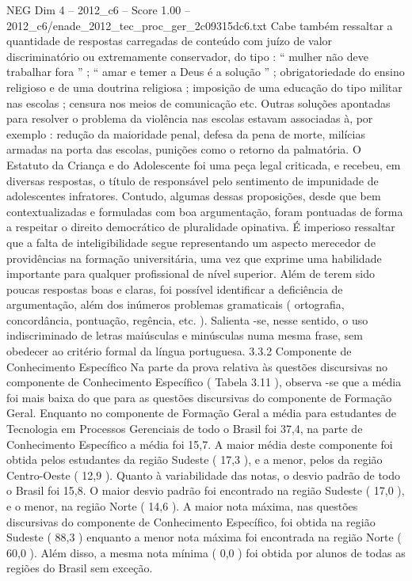 \begin{textsample}{NEG Dim 4 – 2012\_c6 – Score 1.00 – 2012\_c6/enade\_2012\_tec\_proc\_ger\_2c09315dc6.txt}
Cabe também ressaltar a quantidade de respostas carregadas de conteúdo com juízo de valor discriminatório ou extremamente conservador, do tipo : “ mulher não deve trabalhar fora ” ; “ amar e temer a Deus é a solução ” ; obrigatoriedade do ensino religioso e de uma doutrina religiosa ; imposição de uma educação do tipo militar nas escolas ; censura nos meios de comunicação etc.
Outras soluções apontadas para resolver o problema da violência nas escolas estavam associadas à, por exemplo : redução da maioridade penal, defesa da pena de morte, milícias armadas na porta das escolas, punições como o retorno da palmatória.
O Estatuto da Criança e do Adolescente foi uma peça legal criticada, e recebeu, em diversas respostas, o título de responsável pelo sentimento de impunidade de adolescentes infratores.
Contudo, algumas dessas proposições, desde que bem contextualizadas e formuladas com boa argumentação, foram pontuadas de forma a respeitar o direito democrático de pluralidade opinativa.
É imperioso ressaltar que a falta de inteligibilidade segue representando um aspecto merecedor de providências na formação universitária, uma vez que exprime uma habilidade importante para qualquer profissional de nível superior.
Além de terem sido poucas respostas boas e claras, foi possível identificar a deficiência de argumentação, além dos inúmeros problemas gramaticais ( ortografia, concordância, pontuação, regência, etc. ).
Salienta -se, nesse sentido, o uso indiscriminado de letras maiúsculas e minúsculas numa mesma frase, sem obedecer ao critério formal da língua portuguesa. 3.3.2 Componente de Conhecimento Específico Na parte da prova relativa às questões discursivas no componente de Conhecimento Específico ( Tabela 3.11 ), observa -se que a média foi mais baixa do que para as questões discursivas do componente de Formação Geral.
Enquanto no componente de Formação Geral a média para estudantes de Tecnologia em Processos Gerenciais de todo o Brasil foi 37,4, na parte de Conhecimento Específico a média foi 15,7.
A maior média deste componente foi obtida pelos estudantes da região Sudeste ( 17,3 ), e a menor, pelos da região Centro-Oeste ( 12,9 ).
Quanto à variabilidade das notas, o desvio padrão de todo o Brasil foi 15,8.
O maior desvio padrão foi encontrado na região Sudeste ( 17,0 ), e o menor, na região Norte ( 14,6 ).
A maior nota máxima, nas questões discursivas do componente de Conhecimento Específico, foi obtida na região Sudeste ( 88,3 ) enquanto a menor nota máxima foi encontrada na região Norte ( 60,0 ).
Além disso, a mesma nota mínima ( 0,0 ) foi obtida por alunos de todas as regiões do Brasil sem exceção.

\end{textsample}
